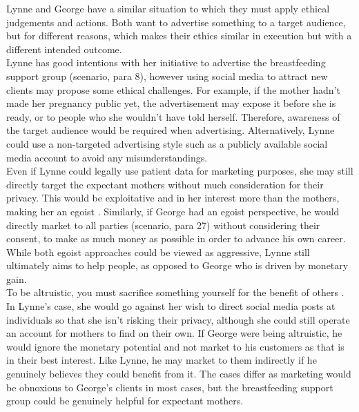\documentclass[12pt,a4paper]{article}
\begin{document}
Lynne and George have a similar situation to which they must apply ethical judgements and actions. Both want to advertise something to a target audience, but for different reasons, which makes their ethics similar in execution but with a different intended outcome.\\



Lynne has good intentions with her initiative to advertise the breastfeeding support group (scenario, para 8), however using social media to attract new clients may propose some ethical challenges. For example, if the mother hadn't made her pregnancy public yet, the advertisement may expose it before she is ready, or to people who she wouldn't have told herself. Therefore, awareness of the target audience would be required when advertising. Alternatively, Lynne could use a non-targeted advertising style such as a publicly available social media account to avoid any misunderstandings. \\

Even if Lynne could legally use patient data for marketing purposes, she may still directly target the expectant mothers without much consideration for their privacy. This would be exploitative and in her interest more than the mothers, making her an egoist \cite{Egoism}. Similarly, if George had an egoist perspective, he would directly market to all parties (scenario, para 27) without considering their consent, to make as much money as possible in order to advance his own career. While both egoist approaches could be viewed as aggressive, Lynne still ultimately aims to help people, as opposed to George who is driven by monetary gain.\\

To be altruistic, you must sacrifice something yourself for the benefit of others \cite{Altruism}. In Lynne's case, she would go against her wish to direct social media posts at individuals so that she isn't risking their privacy, although she could still operate an account for mothers to find on their own. If George were being altruistic, he would ignore the monetary potential and not market to his customers as that is in their best interest. Like Lynne, he may market to them indirectly if he genuinely believes they could benefit from it. The cases differ as marketing would be obnoxious to George's clients in most cases, but the breastfeeding support group could be genuinely helpful for expectant mothers.\\
\end{document}
